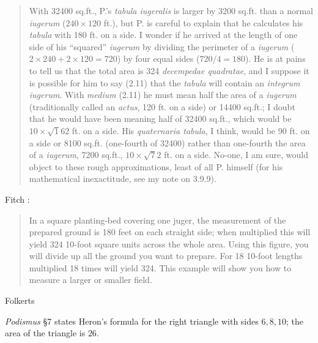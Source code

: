 \documentclass{article}
\theoremstyle{definition}
\begin{document}
\begin{quote}
With 32400 sq.ft., P.'s {\em tabula iugeralis} is larger by 3200 sq.ft. than a normal {\em iugerum} ($240 \times 120$ ft.),
but P. is careful to explain that he calculates his {\em tabula} with 180 ft. on a side. I wonder if he arrived at the length of one side
of his ``squared'' {\em iugerum} by dividing the perimeter of a {\em iugerum} ($2 \times 240+2 \times 120=720$) by four equal
sides ($720/4=180$). He is at pains to tell us that the total area is 324 {\em decempedae quadratae}, and I suppose  it is
possible for him to say (2.11) that the {\em tabula} will contain an {\em integrum iugerum}. With {\em medium} (2.11) he must mean
half the area of a {\em iugerum} (traditionally called an {\em actus}, 120 ft. on a side) or 14400 sq.ft.; I doubt that he would
have been meaning half of 32400 sq.ft., which would be $10 \times \surd 162$ ft. on a side. His {\em quaternaria tabula}, I think,
would be 90 ft. on a side or 8100 sq.ft. (one-fourth of 32400) rather than one-fourth the area of a {\em iugerum}, 7200 sq.ft.,
$10 \times \surd 72$ ft. on a side. No-one, I am sure, would object to these rough approximations, least of all P. himself (for his mathematical inexactitude, see my note
on 3.9.9).
\end{quote}

Fitch \cite[p.~75]{fitch}:

\begin{quote}
In a square planting-bed covering one juger, the measurement of the prepared ground is 180 feet on each straight side; when multiplied this will yield 324 10-foot square units across the whole area. Using this figure, you will divide up all the ground you want to prepare. For 18 10-foot lengths multiplied 18 times will yield 324.
This example will show you how to measure a larger or smaller field.
\end{quote}

Folkerts \cite{folkerts}

{\em Podismus} \S 7 \cite[pp.~134--137]{guillaumin} states Heron's formula for the right triangle with sides
$6,8,10$; the area of the triangle is $26$.  
\end{document}
